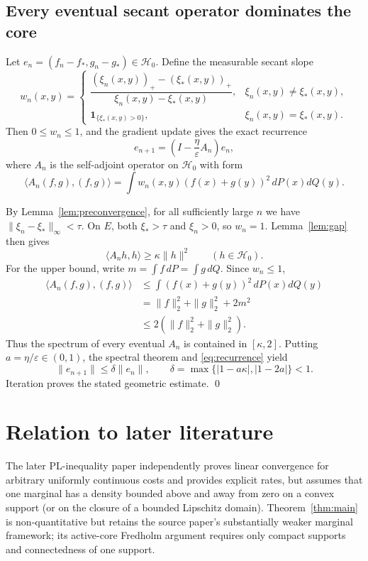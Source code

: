 \documentclass[11pt]{article}
\newcommand{\cH}{\mathcal{H}}
\newcommand{\eps}{\varepsilon}
\newcommand{\1}{\mathbf{1}}
\begin{document}
\subsection{Every eventual secant operator dominates the core}

Let $e_n=(f_n-f_*,g_n-g_*)\in\cH_0$.  Define the measurable secant slope
\[
 w_n(x,y)=
 \begin{cases}
 \dfrac{(\xi_n(x,y))_+-(\xi_*(x,y))_+}
       {\xi_n(x,y)-\xi_*(x,y)},&\xi_n(x,y)\ne\xi_*(x,y),\\[1.2ex]
 \1_{\{\xi_*(x,y)>0\}},&\xi_n(x,y)=\xi_*(x,y).
 \end{cases}
\]
Then $0\le w_n\le1$, and the gradient update gives the exact recurrence
\begin{equation}
\label{eq:recurrence}
 e_{n+1}=\left(I-\frac\eta\eps A_n\right)e_n,
\end{equation}
where $A_n$ is the self-adjoint operator on $\cH_0$ with form
\[
 \langle A_n(f,g),(f,g)\rangle
 =\int w_n(x,y)(f(x)+g(y))^2\,dP(x)dQ(y).
\]

By Lemma~\ref{lem:preconvergence}, for all sufficiently large $n$ we have
$\|\xi_n-\xi_*\|_\infty<\tau$.  On $E$, both $\xi_*>\tau$ and $\xi_n>0$,
so $w_n=1$.  Lemma~\ref{lem:gap} then gives
\begin{equation}
\label{eq:lower}
 \langle A_nh,h\rangle\ge\kappa\|h\|^2\qquad(h\in\cH_0).
\end{equation}
For the upper bound, write
$m=\int f\,dP=\int g\,dQ$.  Since $w_n\le1$,
\begin{align*}
 \langle A_n(f,g),(f,g)\rangle
 &\le\int(f(x)+g(y))^2\,dP(x)dQ(y)\\
 &=\|f\|_2^2+\|g\|_2^2+2m^2\\
 &\le2(\|f\|_2^2+\|g\|_2^2).
\end{align*}
Thus the spectrum of every eventual $A_n$ is contained in $[\kappa,2]$.
Putting $a=\eta/\eps\in(0,1)$, the spectral theorem and
\eqref{eq:recurrence} yield
\[
 \|e_{n+1}\|\le\delta\|e_n\|,
 \qquad
 \delta=\max\{|1-a\kappa|,|1-2a|\}<1.
\]
Iteration proves the stated geometric estimate.
\qed

\section{Relation to later literature}

The later PL-inequality paper \cite{GNRPL2026} independently proves linear
convergence for arbitrary uniformly continuous costs and provides explicit
rates, but assumes that one marginal has a density bounded above and away
from zero on a convex support (or on the closure of a bounded Lipschitz
domain).  Theorem~\ref{thm:main} is non-quantitative but retains the source
paper's substantially weaker marginal framework; its active-core Fredholm
argument requires only compact supports and connectedness of one support.
\end{document}
